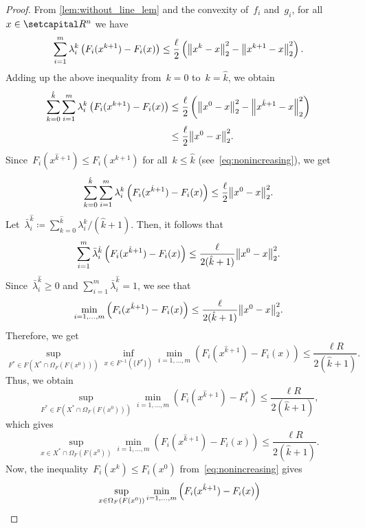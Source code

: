 \documentclass[../../main]{subfiles}
\begin{document}
\begin{proof}
	From \cref{lem:without_line_lem} and the convexity of~$f_i$ and~$g_i$, for all~$x \in \setR^n$ we have
    \[
		\sum_{i = 1}^m \lambda_i^k \left(F_i(x^{k + 1}) - F_i(x)\right) \le \frac{\ell}{2} \left( \norm*{x^k - x}_2^2 - \norm*{x^{k + 1} - x}_2^2 \right)
    .\]
    Adding up the above inequality from~$k = 0$ to~$k = \hat{k}$, we obtain
    \[
        \begin{split}
            \sum_{k = 0}^{\hat{k}} \sum_{i = 1}^m \lambda_i^k \left(F_i(x^{k + 1}) - F_i(x)\right) &\le \frac{\ell}{2} \left( \norm*{ x^0 - x}_2^2 - \norm*{ x^{\hat{k} + 1} - x}_2^2 \right) \\
        &\le \frac{\ell}{2} \norm*{x^0 - x}_2^2
        .\end{split}
    \]
    Since~$F_i(x^{\hat{k} + 1}) \le F_i(x^{k + 1})$ for all~$k \le \hat{k}$ (see~\cref{eq:nonincreasing}), we get
    \[
        \sum_{k = 0}^{\hat{k}} \sum_{i = 1}^m \lambda_i^k \left(F_i(x^{\hat{k} + 1}) - F_i(x)\right) \le \frac{\ell}{2} \norm*{x^0 - x}_2^2.
    \]
    Let~$\bar{\lambda}_i^{\hat{k}} \coloneqq \sum_{k = 0}^{\hat{k}} \lambda_i^k / (\hat{k} + 1)$. Then, it follows that
	\[
        \sum_{i = 1}^m \bar{\lambda}_i^{\hat{k}} \left(F_i(x^{\hat{k} + 1}) - F_i(x)\right)  \le \frac{\ell}{2 (\hat{k} + 1)} \norm*{x^0 - x}_2^2.
	\]
    Since~$\bar{\lambda}_i^{\hat{k}} \ge 0$ and $\sum_{i = 1}^m \bar{\lambda}_i^{\hat{k}} = 1$, we see that
	\[
        \min_{i = 1, \dots, m} \left( F_i(x^{\hat{k} + 1}) - F_i(x) \right) \le \frac{\ell}{2 (\hat{k} + 1)} \norm*{x^0 - x}_2^2.
	\]
    Therefore, we get
	\[
        \sup_{F^\ast \in F(X^\ast \cap \Omega_F(F(x^0)))} \inf_{x \in F^{-1}(\{F^\ast\})} \min_{i = 1, \dots, m} \left( F_i(x^{\hat{k} + 1}) - F_i(x) \right) \le \frac{\ell R}{2 (\hat{k} + 1)}.
	\]
    Thus, we obtain
    \[
        \sup_{F^\ast \in F(X^\ast \cap \Omega_F(F(x^0)))} \min_{i = 1, \dots, m} \left( F_i(x^{\hat{k} + 1}) - F_i^\ast \right) \le \frac{\ell R}{2 (\hat{k} + 1)},
    \]
    which gives
    \begin{equation} \label{eq:pareto level bound}
        \sup_{x \in X^\ast \cap \Omega_F(F(x^0))} \min_{i = 1, \dots, m} \left( F_i(x^{\hat{k} + 1}) - F_i(x) \right) \le \frac{\ell R}{2 (\hat{k} + 1)}.
    \end{equation}
    Now, the inequality~$F_i(x^k) \le F_i(x^0)$ from~\cref{eq:nonincreasing} gives
    \[
        \begin{split}
            \MoveEqLeft[.5] \sup_{x \in \Omega_F(F(x^0))} \min_{i = 1, \dots, m} \left( F_i(x^{\hat{k} + 1}) - F_i(x) \right) \\

\end{split}\]
\end{proof}
\end{document}
